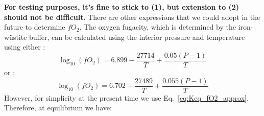 \textbf{For testing purposes, it's fine to stick to (1), but extension to (2) should not be difficult}.  There are other expressions that we could adopt in the future to determine $fO_2$.  The oxygen fugacity, which is determined by the iron-w\"{u}stite buffer, can be calculated using the interior pressure and temperature using either \citep{O87}: 
\begin{equation}
    \log_{10}\left(fO_2\right) = 6.899 - \frac{27714}{T} + \frac{0.05(P-1)}{T}
\end{equation}
or \citep{F91}:
\begin{equation}
    \log_{10}\left(fO_2\right) = 6.702-\frac{27489}{T} + \frac{0.055(P-1)}{T}
\end{equation}
However, for simplicity at the present time we use Eq.~\ref{eq:Keq_fO2_approx}.  Therefore, at equilibrium we have:
